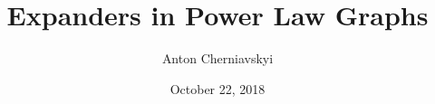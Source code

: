 \documentclass{sfuthesis}
\title{Expanders in Power Law Graphs}
\author{Anton Cherniavskyi}
\date{October 22, 2018}
\theoremstyle{plain}
\theoremstyle{plain}
\theoremstyle{plain}
\theoremstyle{definition}
\begin{document}
\frontmatter
\maketitle{}
\makecommittee{}


\begin{abstract}
    
\end{abstract}

\begin{dedication}
    
\end{dedication}

\begin{acknowledgements}
    
\end{acknowledgements}

%
\tableofcontents%
\clearpage

%
\listoftables%
\clearpage

%
\listoffigures%
\clearpage



%
%

\mainmatter%










%
%
%
%
%

\backmatter%



\begin{appendices} %
    
    
\end{appendices}
\end{document}
